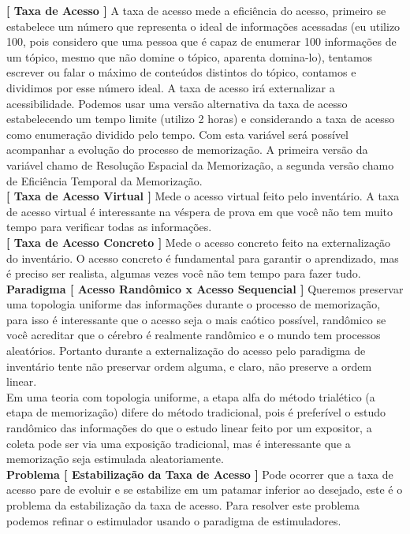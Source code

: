 \documentclass[10pt,a4paper]{report}
\begin{document}
\textbf{[ Taxa de Acesso ]} A taxa de acesso mede a eficiência do acesso, primeiro se estabelece um número que representa o ideal de informações acessadas (eu utilizo 100, pois considero que uma pessoa que é capaz de enumerar 100 informações de um tópico, mesmo que não domine o tópico, aparenta domina-lo), tentamos escrever ou falar o máximo de conteúdos distintos do tópico, contamos e dividimos por esse número ideal. A taxa de acesso irá externalizar a acessibilidade. Podemos usar uma versão alternativa da taxa de acesso estabelecendo um tempo limite (utilizo 2 horas) e considerando a taxa de acesso como enumeração dividido pelo tempo. Com esta variável será possível acompanhar a evolução do processo de memorização. A primeira versão da variável chamo de Resolução Espacial da Memorização, a segunda versão chamo de Eficiência Temporal da Memorização. \\

\textbf{[ Taxa de Acesso Virtual ]} Mede o acesso virtual feito pelo inventário. A taxa de acesso virtual é interessante na véspera de prova em que você não tem muito tempo para verificar todas as informações. \\

\textbf{[ Taxa de Acesso Concreto ]} Mede o acesso concreto feito na externalização do inventário. O acesso concreto é fundamental para garantir o aprendizado, mas é preciso ser realista, algumas vezes você não tem tempo para fazer tudo.\\

\textbf{Paradigma [ Acesso Randômico x Acesso Sequencial ]} Queremos preservar uma topologia uniforme das informações durante o processo de memorização, para isso é interessante que o acesso seja o mais caótico possível, randômico se você acreditar que o cérebro é realmente randômico e o mundo tem processos aleatórios. Portanto durante a externalização do acesso pelo paradigma de inventário tente não preservar ordem alguma, e claro, não preserve a ordem linear.\\

Em uma teoria com topologia uniforme, a etapa alfa do método trialético (a etapa de memorização) difere do método tradicional, pois é preferível o estudo randômico das informações do que o estudo linear feito por um expositor, a coleta pode ser via uma exposição tradicional, mas é interessante que a memorização seja estimulada aleatoriamente. \\

\textbf{Problema [ Estabilização da Taxa de Acesso ]} Pode ocorrer que a taxa de acesso pare de evoluir e se estabilize em um patamar inferior ao desejado, este é o problema da estabilização da taxa de acesso. Para resolver este problema podemos refinar o estimulador usando o paradigma de estimuladores.\\
\end{document}
